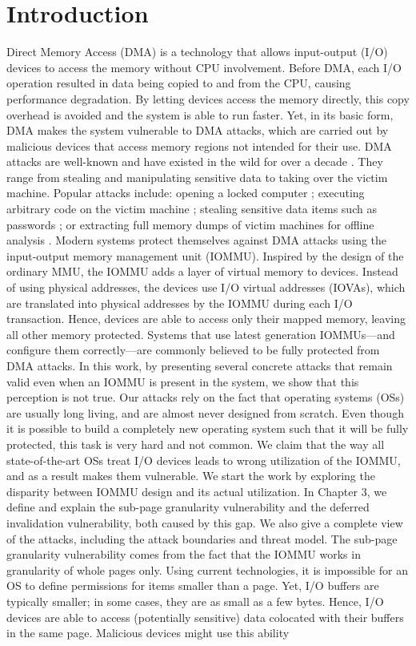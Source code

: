 \section{Introduction}
Direct Memory Access (DMA) is a technology that allows input-output (I/O) devices to access the memory without CPU involvement. Before DMA, each I/O operation resulted in data being copied to and from the CPU, causing performance degradation. By letting devices access the memory directly, this copy overhead is avoided and the system is able to run faster. Yet, in its basic form, DMA makes the system vulnerable to DMA attacks, which are carried out by malicious devices that access memory regions not intended for their use. DMA attacks are well-known and have existed in the wild for over a decade \cite{Dor04,BDK10}. They range from stealing and manipulating sensitive data to taking over the victim machine. Popular attacks include: opening a locked computer \cite{MM, Fin14}; executing arbitrary code on the victim machine \cite{Fri16, Woj08, AD10}; stealing sensitive data items such as passwords \cite{SB12, LKV13, Cim16, BR12}; or extracting full memory dumps of victim machines for offline analysis \cite{MM, Vol, Fin14, GA10}. Modern systems protect themselves against DMA attacks using the input-output memory management unit (IOMMU). Inspired by the design of the ordinary MMU, the IOMMU adds a layer of virtual memory to devices. Instead of using physical addresses, the devices use I/O virtual addresses (IOVAs), which are translated into physical addresses by the IOMMU during each I/O transaction. Hence, devices are able to access only their mapped memory, leaving all other memory protected. Systems that use latest generation IOMMUs—and configure them correctly—are commonly believed to be fully protected from DMA attacks. In this work, by presenting several concrete attacks that remain valid even when an IOMMU is present in the system, we show that this perception is not true. Our attacks rely on the fact that operating systems (OSs) are usually long living, and are almost never designed from scratch. Even though it is possible to build a completely new operating system such that it will be fully protected, this task is very hard and not common. We claim that the way all state-of-the-art OSs treat I/O devices leads to wrong utilization of the IOMMU, and as a result makes them vulnerable. We start the work by exploring the disparity between IOMMU design and its actual utilization. In Chapter 3, we define and explain the sub-page granularity vulnerability and the deferred invalidation vulnerability, both caused by this gap. We also give a complete view of the attacks, including the attack boundaries and threat model. The sub-page granularity vulnerability comes from the fact that the IOMMU works in granularity of whole pages only. Using current technologies, it is impossible for an OS to define permissions for items smaller than a page. Yet, I/O buffers are typically smaller; in some cases, they are as small as a few bytes. Hence, I/O devices are able to access (potentially sensitive) data colocated with their buffers in the same page. Malicious devices might use this ability 